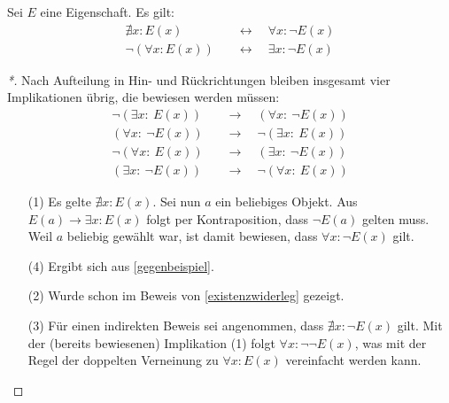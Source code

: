 \begin{satz} \label{quantorennegieren} 
    Sei $E$ eine Eigenschaft. Es gilt:
    \begin{align*}
        \nexists x: E(x) \quad& \leftrightarrow\quad \forall x: \neg E(x) \\
        \neg (\forall x: E(x)) \quad& \leftrightarrow\quad \exists x: \neg E(x)
    \end{align*}
\end{satz}
\begin{proof}[*]
    Nach Aufteilung in Hin- und Rückrichtungen bleiben insgesamt vier Implikationen übrig, die bewiesen werden müssen:
    \begin{align}
        \neg (\exists x:\ E(x)) \quad& \to\quad (\forall x:\ \neg E(x)) \tag{1} \\
        (\forall x:\ \neg E(x)) \quad& \to\quad \neg (\exists x:\ E(x)) \tag{2} \\
        \neg (\forall x:\ E(x)) \quad& \to\quad (\exists x:\ \neg E(x)) \tag{3} \\
        (\exists x:\ \neg E(x)) \quad& \to\quad \neg (\forall x:\ E(x)) \tag{4}
    \end{align}
    \begin{enumerate}
        \item[(1)] Es gelte $\nexists x : E(x)$. Sei nun $a$ ein beliebiges Objekt. Aus $E(a)\to\exists x: E(x)$ folgt per Kontraposition, dass $\neg E(a)$ gelten muss. Weil $a$ beliebig gewählt war, ist damit bewiesen, dass $\forall x: \neg E(x)$ gilt.
        \item[(4)] Ergibt sich aus \cref{gegenbeispiel}.
        \item[(2)] Wurde schon im Beweis von \cref{existenzwiderleg} gezeigt.
        \item[(3)] Für einen indirekten Beweis sei angenommen, dass $\nexists x: \neg E(x)$ gilt. Mit der (bereits bewiesenen) Implikation (1) folgt $\forall x: \neg\neg E(x)$, was mit der Regel der doppelten Verneinung zu $\forall x: E(x)$ vereinfacht werden kann. \qedhere
    \end{enumerate}
\end{proof}


